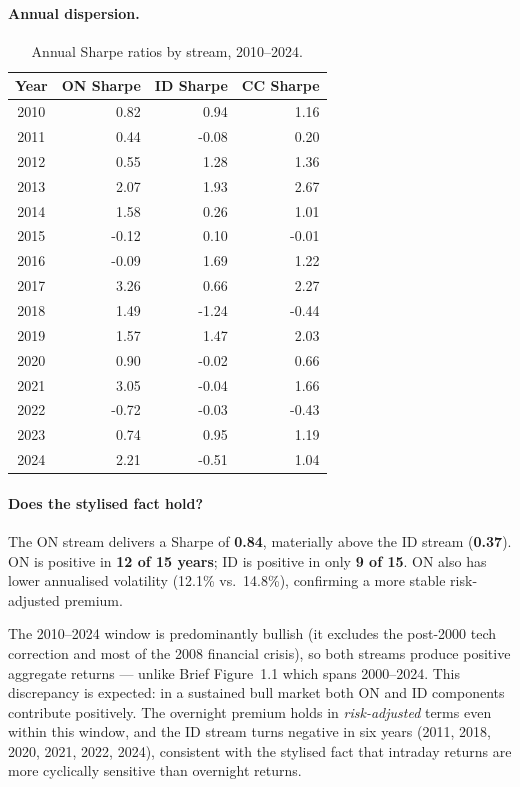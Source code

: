\documentclass[12pt,a4paper]{article}
\begin{document}
\paragraph{Annual dispersion.}

\begin{table}[H]
\centering
\caption{Annual Sharpe ratios by stream, 2010--2024.}
\label{tab:yearly_sharpe}
\begin{tabular}{crrr}
\toprule
Year & ON Sharpe & ID Sharpe & CC Sharpe \\
\midrule
2010 &  0.82 &  0.94 &  1.16 \\
2011 &  0.44 & -0.08 &  0.20 \\
2012 &  0.55 &  1.28 &  1.36 \\
2013 &  2.07 &  1.93 &  2.67 \\
2014 &  1.58 &  0.26 &  1.01 \\
2015 & -0.12 &  0.10 & -0.01 \\
2016 & -0.09 &  1.69 &  1.22 \\
2017 &  3.26 &  0.66 &  2.27 \\
2018 &  1.49 & -1.24 & -0.44 \\
2019 &  1.57 &  1.47 &  2.03 \\
2020 &  0.90 & -0.02 &  0.66 \\
2021 &  3.05 & -0.04 &  1.66 \\
2022 & -0.72 & -0.03 & -0.43 \\
2023 &  0.74 &  0.95 &  1.19 \\
2024 &  2.21 & -0.51 &  1.04 \\
\bottomrule
\end{tabular}
\end{table}

\paragraph{Does the stylised fact hold?}
The ON stream delivers a Sharpe of \textbf{0.84}, materially above the ID
stream (\textbf{0.37}).  ON is positive in \textbf{12 of 15 years}; ID is
positive in only \textbf{9 of 15}.  ON also has lower annualised volatility
(12.1\% vs.\ 14.8\%), confirming a more stable risk-adjusted premium.

The 2010--2024 window is predominantly bullish (it excludes the post-2000
tech correction and most of the 2008 financial crisis), so both streams
produce positive aggregate returns --- unlike Brief Figure~1.1 which spans
2000--2024.  This discrepancy is expected: in a sustained bull market both
ON and ID components contribute positively.  The overnight premium holds in
\emph{risk-adjusted} terms even within this window, and the ID stream turns
negative in six years (2011, 2018, 2020, 2021, 2022, 2024), consistent with
the stylised fact that intraday returns are more cyclically sensitive than
overnight returns.
\end{document}

